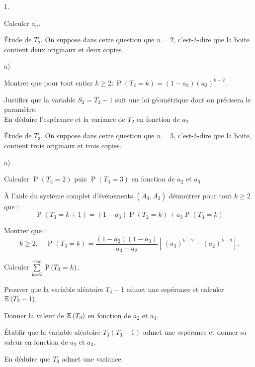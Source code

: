 \documentclass[11pt]{article}%
\begin{document}
\begin{noliste}{1.}
 \setlength{\itemsep}{4mm}
\item Calculer $a_{n}$.

\item \underline{Étude de $T_{2}$}. On suppose dans cette question que
$n = 2$, c'est-à-dire que la boite contient deux originaux et deux
copies.

\begin{noliste}{a)}
 \setlength{\itemsep}{2mm}
\item Montrer que pour tout entier $k\geq 2 :\operatorname{P}\left(
T_{2} = k\right)
 = \left( 1-a_{2}\right) \left( a_{2}\right) ^{k-2}.$

\item Justifier que la variable $S_{2} = T_{2}-1$ suit une loi
géométrique dont on précisera le paramètre.\\
En déduire l'espérance et la variance de $T_{2}$ en fonction de $a_{2}$
\end{noliste}

\item \underline{Étude de $T_{3}$}. On suppose dans cette question que
$n = 3$, c'est-à-dire que la boite, contient trois originaux et trois
copies.

\begin{noliste}{a)}
 \setlength{\itemsep}{2mm}
\item Calculer $\operatorname{P}\left( T_{3} = 2\right) $ puis
$\operatorname{P}\left(
T_{3} = 3\right) $ en fonction de $a_{2}$ et $a_{3}$

\item À l'aide du système complet d'événements $\left(
A_{3},\overline{A_{3}}\right) $ démontrer pour tout $k\geq 2$ que :
\[
\operatorname{P}\left( T_{3} = k + 1\right) = \left( 1-a_{3}\right)
\operatorname{P}\left(
T_{2} = k\right) + a_{3}\operatorname{P}\left( T_{3} = k\right)
\]

\item Montrer que :
\[
k\geq 2,\quad \operatorname{P}\left( T_{3} = k\right) = \frac{\left(
1-a_{2}\right)
\left( 1-a_{3}\right) }{a_{3}-a_{2}}\left[ \ \left( a_{3}\right)
^{k-2}-\left(
a_{2}\right) ^{k-2}\right].
\]

\item Calculer ${\textstyle\sum\limits_{k = 2}^{+ \infty }}\hspace{.1cm}\operatorname{P}\left(
T_{3} = k\right).$

\item Prouver que la variable aléatoire $T_{3}-1$ admet une espérance
et calculer $\mathbb{E}\left( T_{3}-1\right) $.

Donner la valeur de $\mathbb{E}\left( T_{3}\right) $ en fonction de $a_{2}$ et
$a_{3}$.

\item Établir que la variable aléatoire $T_{3}\left( T_{3}-1\right) $
admet une espérance et donner sa valeur en fonction de $a_{2}$ et
$a_{3}$.

En déduire que $T_{3}$ admet une variance.
\end{noliste}
\end{noliste}
\end{document}
